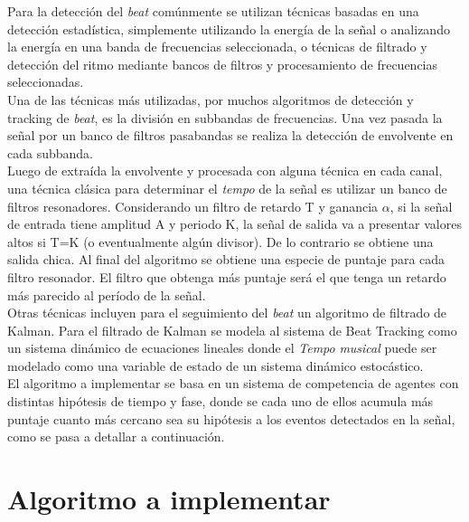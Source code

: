 \documentclass[12pt,a4paper,titlepage]{report}
\begin{document}
Para la detección del \emph{beat} comúnmente se utilizan técnicas basadas en una detección estadística, simplemente utilizando la energía de la señal o analizando la energía en una banda de frecuencias seleccionada, o técnicas de filtrado y detección del ritmo mediante bancos de filtros y procesamiento de frecuencias seleccionadas.\\

Una de las técnicas más utilizadas, por muchos algoritmos de detección y tracking de \emph{beat}, es la división en subbandas de frecuencias. Una vez pasada la señal por un banco de filtros pasabandas se realiza la detección de envolvente en cada subbanda.\\

Luego de extraída la envolvente y procesada con alguna técnica en cada canal, una técnica clásica para determinar el \emph{tempo} de la señal es utilizar un banco de filtros resonadores.
Considerando un filtro de retardo T y ganancia $\alpha$, si la señal de entrada tiene amplitud A y periodo K, la señal de salida va a presentar valores altos si T=K (o eventualmente algún divisor). De lo contrario se obtiene una salida chica. Al final del algoritmo se obtiene una especie de puntaje para cada filtro resonador. El filtro que obtenga más puntaje será el que tenga un retardo más parecido al período de la señal.\\

Otras técnicas incluyen para el seguimiento del \emph{beat} un algoritmo de filtrado de Kalman. Para el filtrado de Kalman se modela al sistema de Beat Tracking como un sistema dinámico de ecuaciones lineales donde el \emph{Tempo} \emph{musical} puede ser modelado como una variable de estado de un sistema dinámico estocástico.\\

El algoritmo a implementar se basa en un sistema de competencia de agentes con distintas hipótesis de tiempo y fase, donde se cada uno de ellos acumula más puntaje cuanto más cercano sea su hipótesis a los eventos detectados en la señal, como se pasa a detallar a continuación.\\

\section{Algoritmo a implementar}
\end{document}
